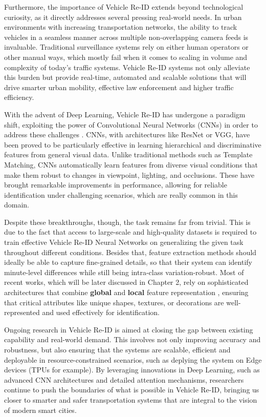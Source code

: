 Furthermore, the importance of Vehicle Re-ID extends beyond technological curiosity, as it directly addresses several pressing real-world needs. In urban environments with increasing transportation networks, the ability to track vehicles in a seamless manner across multiple non-overlapping camera feeds is invaluable. Traditional surveillance systems rely on either human operators or other manual ways, which mostly fail when it comes to scaling in volume and complexity of today's traffic systems. Vehicle Re-ID systems not only alleviate this burden but provide real-time, automated and scalable solutions that will drive smarter urban mobility, effective law enforcement and higher traffic efficiency.

With the advent of Deep Learning, Vehicle Re-ID has undergone a paradigm shift, exploiting the power of Convolutional Neural Networks (CNNs) in order to address these challenges \cite{MultiAttributeSpatialTemporal, LearningCoarseStructuredFeature, VRIC2}. CNNs, with architectures like ResNet or VGG, have been proved to be particularly effective in learning hierarchical and discriminative features from general visual data. Unlike traditional methods such as Template Matching, CNNs automatically learn features from diverse visual conditions that make them robust to changes in viewpoint, lighting, and occlusions. These have brought remarkable improvements in performance, allowing for reliable identification under challenging scenarios, which are really common in this domain.

Despite these breakthroughs, though, the task remains far from trivial. This is due to the fact that access to large-scale and high-quality datasets is required to train effective Vehicle Re-ID Neural Networks on generalizing the given task throughout different conditions. Besides that, feature extraction methods should ideally be able to capture fine-grained details, so that their system can identify minute-level differences while still being intra-class variation-robust. Most of recent works, which will be later discussed in Chapter 2, rely on sophisticated architectures that combine \textbf{global} and \textbf{local} feature representation \cite{VehicleReID_1, VehicleReID_2, VehicleReID_3}, ensuring that critical attributes like unique shapes, textures, or decorations are well-represented and used effectively for identification.

Ongoing research in Vehicle Re-ID is aimed at closing the gap between existing capability and real-world demand. This involves not only improving accuracy and robustness, but also ensuring that the systems are scalable, efficient and deployable in resource-constrained scenarios, such as deplying the system on Edge devices (TPUs for example). By leveraging innovations in Deep Learning, such as advanced CNN architectures and detailed attention mechanisms, researchers continue to push the boundaries of what is possible in Vehicle Re-ID, bringing us closer to smarter and safer transportation systems that are integral to the vision of modern smart cities.

